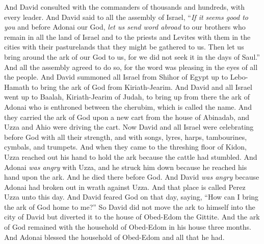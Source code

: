 \begin{biblechapter} %
 And David consulted with the commanders of thousands and hundreds, with every leader.
\verse And David said to all the assembly of Israel, “\textit{If it seems good to you} and before Adonai our God, \textit{let us send word abroad} to our brothers who remain in all the land of Israel and to the priests and Levites with them in the cities with their pasturelands that they might be gathered to us.
\verse Then let us bring around the ark of our God to us, for we did not seek it in the days of Saul.”
\verse And all the assembly agreed to do so, for the word was pleasing in the eyes of all the people.
\verse And David summoned all Israel from Shihor of Egypt up to Lebo-Hamath to bring the ark of God from Kiriath-Jearim.
\verse And David and all Israel went up to Baalah, Kiriath-Jearim of Judah, to bring up from there the ark of Adonai who is enthroned between the cherubim, which is called the name.
\verse And they carried the ark of God upon a new cart from the house of Abinadab, and Uzza and Ahio were driving the cart.
\verse Now David and all Israel were celebrating before God with all their strength, and with songs, lyres, harps, tambourines, cymbals, and trumpets.
\verse And when they came to the threshing floor of Kidon, Uzza reached out his hand to hold the ark because the cattle had stumbled.
\verse And Adonai \textit{was angry} with Uzza, and he struck him down because he reached his hand upon the ark. And he died there before God.
\verse And David \textit{was angry} because Adonai had broken out in wrath against Uzza. And that place is called Perez Uzza unto this day.
\verse And David feared God on that day, saying, “How can I bring the ark of God home to me?”
\verse So David did not move the ark to himself into the city of David but diverted it to the house of Obed-Edom the Gittite.
\verse And the ark of God remained with the household of Obed-Edom in his house three months. And Adonai blessed the household of Obed-Edom and all that he had.
\end{biblechapter}

